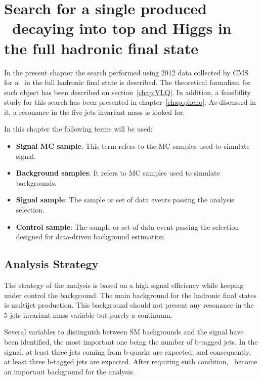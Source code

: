 \chapter[Single VLQ search]{Search for a single produced \Tp~decaying into top and Higgs in the full hadronic final state}
\label{chap:search}

In the present chapter the search performed using 2012 data collected by CMS for a \Tp~in the full hadronic final state is described. The theoretical formalism for such object has been described on section~\ref{chap:VLQ}. In addition, a feasibility study for this search has been presented in chapter~\ref{chap:pheno}. As discussed in it, a resonance in the five jets invariant mass is looked for.

In this chapter the following terms will be used:
\begin{itemize}
\item \textbf{Signal MC sample}: This term refers to the MC samples used to simulate signal.
\item \textbf{Background samples}: It refers to MC samples used to simulate backgrounds.
\item \textbf{Signal sample}: The sample or set of data events passing the analysis selection.
\item \textbf{Control sample}: The sample or set of data event passing the selection designed for data-driven background estimation.
\end{itemize}

\section{Analysis Strategy}
\label{sec:stra}

The strategy of the analysis is based on a high signal efficiency while keeping under control the background. The main background for the hadronic final states is multijet production. This background should not present any resonance in the 5-jets invariant mass variable but purely a continuum. %

Several variables to distinguish between SM backgrounds and the signal have been identified, the most important one being the number of b-tagged jets. In the signal, at least three jets coming from b-quarks are expected, and consequently, at least three b-tagged jets are expected. After requiring such condition, \ttbar~become an important background for the analysis. %

